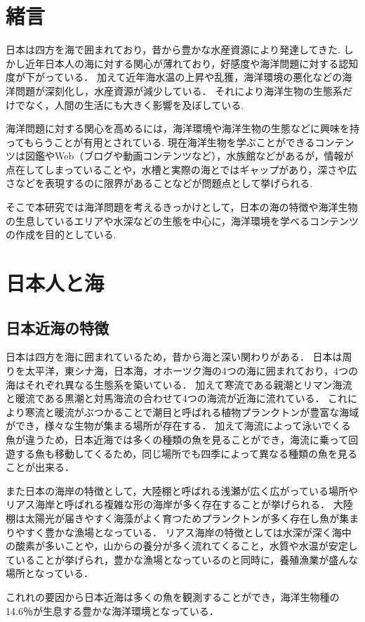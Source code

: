 \documentclass[12pt,a4j,titlepage]{ltjsarticle}
\begin{document}
\section{緒言}\label{緒言}
日本は四方を海で囲まれており，昔から豊かな水産資源により発達してきた.
しかし近年日本人の海に対する関心が薄れており，好感度や海洋問題に対する認知度が下がっている．
加えて近年海水温の上昇や乱獲，海洋環境の悪化などの海洋問題が深刻化し，水産資源が減少している．
それにより海洋生物の生態系だけでなく，人間の生活にも大きく影響を及ぼしている.\par
海洋問題に対する関心を高めるには，海洋環境や海洋生物の生態などに興味を持ってもらうことが有用とされている.
現在海洋生物を学ぶことができるコンテンツは図鑑やWeb（ブログや動画コンテンツなど），水族館などがあるが，情報が点在してしまっていることや，水槽と実際の海とではギャップがあり，深さや広さなどを表現するのに限界があることなどが問題点として挙げられる.\par
そこで本研究では海洋問題を考えるきっかけとして，日本の海の特徴や海洋生物の生息しているエリアや水深などの生態を中心に，海洋環境を学べるコンテンツの作成を目的としている.

\clearpage

\section{日本人と海}\label{人と海}

\subsection{日本近海の特徴}
日本は四方を海に囲まれているため，昔から海と深い関わりがある．
日本は周りを太平洋，東シナ海，日本海，オホーツク海の4つの海に囲まれており，4つの海はそれぞれ異なる生態系を築いている．
加えて寒流である親潮とリマン海流と暖流である黒潮と対馬海流の合わせて4つの海流が近海に流れている．
これにより寒流と暖流がぶつかることで潮目と呼ばれる植物プランクトンが豊富な海域ができ，様々な生物が集まる場所が存在する．
加えて海流によって泳いでくる魚が違うため，日本近海では多くの種類の魚を見ることができ，海流に乗って回遊する魚も移動してくるため，同じ場所でも四季によって異なる種類の魚を見ることが出来る．\par
また日本の海岸の特徴として，大陸棚と呼ばれる浅瀬が広く広がっている場所やリアス海岸と呼ばれる複雑な形の海岸が多く存在することが挙げられる．
大陸棚は太陽光が届きやすく海藻がよく育つためプランクトンが多く存在し魚が集まりやすく豊かな漁場となっている．
リアス海岸の特徴としては水深が深く海中の酸素が多いことや，山からの養分が多く流れてくること，水質や水温が安定していることが挙げられ，豊かな漁場となっているのと同時に，養殖漁業が盛んな場所となっている．\par
これれの要因から日本近海は多くの魚を観測することができ，海洋生物種の14.6％が生息する豊かな海洋環境となっている．
\end{document}
